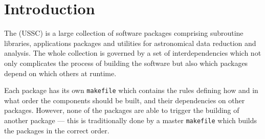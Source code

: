 %
%

\section{Introduction}

The  (USSC) is a large collection of
software packages comprising subroutine libraries, applications
packages and utilities for astronomical data reduction and analysis.
The whole collection is governed by a set of interdependencies which
not only complicates the process of building the software but also
which packages depend on which others at runtime.

Each package has its own {\tt{makefile}} which contains the rules
defining how and in what order the components should be built, and
their dependencies on other packages.  However, none of the packages
are able to trigger the building of another package --- this is
traditionally done by a master {\tt{makefile}} which builds the
packages in the correct order.

